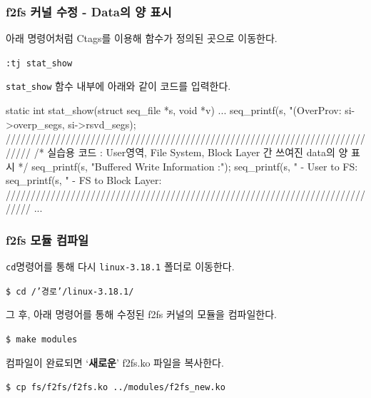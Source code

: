 \documentclass[newPxFont,sthlmFooter,nooffset]{beamer}
\begin{document}
\begin{frame}[containsverbatim,t]
  \frametitle{f2fs 커널 수정 - Data의 양 표시}
아래 명령어처럼 Ctags를 이용해 함수가 정의된 곳으로 이동한다.
\begin{mdframed}[backgroundcolor=lightgray,hidealllines=true]
\texttt{\textcolor[rgb]{0,0,0}{:tj stat\_show}}
\end{mdframed}
\bigskip
\texttt{stat\_show} 함수 내부에 아래와 같이 코드를 입력한다.
\begin{codedef}
static int stat_show(struct seq_file *s, void *v)
{
        ...
        seq_printf(s, "(OverProv:%
                           si->overp_segs, si->rsvd_segs);
/////////////////////////////////////////////////////////////////////////////
/* 실습용 코드 : User영역, File System, Block Layer 간 쓰여진 data의 양 표시 */
        seq_printf(s, "Buffered Write Information :\n");
        seq_printf(s, "  - User to FS: %
        seq_printf(s, "  - FS to Block Layer: %
/////////////////////////////////////////////////////////////////////////////
        ...
}
\end{codedef}
\end{frame}

\begin{frame}[containsverbatim,t]
  \frametitle{f2fs 모듈 컴파일}
\texttt{cd}명령어를 통해 다시 \texttt{linux-3.18.1} 폴더로 이동한다.
\begin{mdframed}[backgroundcolor=lightgray,hidealllines=true]
\texttt{\textcolor[rgb]{0,0,0}{\$ cd /'경로'/linux-3.18.1/}}
\end{mdframed}
\bigskip
그 후, 아래 명령어를 통해 수정된 f2fs 커널의 모듈을 컴파일한다.
\begin{mdframed}[backgroundcolor=lightgray,hidealllines=true]
\texttt{\textcolor[rgb]{0,0,0}{\$ make modules}}
\end{mdframed}
\bigskip
컴파일이 완료되면 `\textbf{새로운}' f2fs.ko 파일을 복사한다.
\begin{mdframed}[backgroundcolor=lightgray,hidealllines=true]
\texttt{\textcolor[rgb]{0,0,0}{\$ cp fs/f2fs/f2fs.ko ../modules/f2fs\_new.ko}}
\end{mdframed}
\bigskip
\end{frame}
\end{document}
